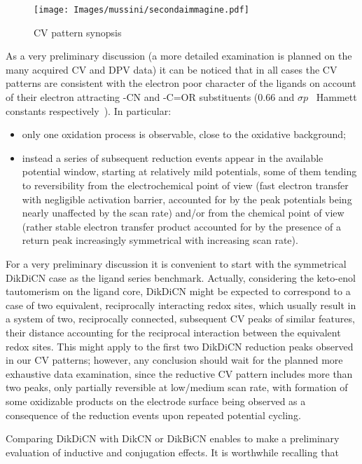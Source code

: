 \documentclass[../Master.tex]{subfiles}
\begin{document}
\begin{figure}[h!]
	\centering
	\texttt{[image: Images/mussini/secondaimmagine.pdf]}
	\caption{CV pattern synopsis}
	\label{fig:synops}

\end{figure}
\newpage

As a very preliminary discussion (a more detailed examination is planned on the
many acquired CV and DPV data) it can be noticed that in all cases the CV
patterns are consistent with the electron poor character of the ligands on
account of their electron attracting -CN and -C=OR substituents (0.66 and 
\(\sigma p\) \ Hammett constants respectively\ \cite{hansch_survey_1991}). In particular:
\begin{itemize}
	\item only one oxidation process is observable, close to the oxidative background;
	\item instead a series of subsequent reduction events appear in the available potential window, starting at relatively mild potentials, some of them tending to reversibility from the electrochemical point of view (fast electron transfer with negligible activation barrier, accounted for by the peak potentials being nearly unaffected by the scan rate) and/or from the chemical point of view (rather stable electron transfer product accounted for by the presence of a return peak increasingly symmetrical with increasing scan rate).
\end{itemize}

For a very preliminary discussion it is convenient to start with the symmetrical DikDiCN case as the ligand series benchmark. Actually, considering the keto-enol tautomerism on the ligand core, DikDiCN might be expected to correspond to a case of two equivalent, reciprocally interacting redox sites, which usually result in a system of two, reciprocally connected, subsequent CV peaks of similar features, their distance accounting for the reciprocal interaction between the equivalent redox sites. This might apply to the first two DikDiCN reduction peaks observed in our CV patterns; however, any conclusion should wait for the planned more exhaustive data examination, since the reductive CV pattern includes more than two peaks, only partially reversible at low/medium scan rate, with formation of some oxidizable products on the electrode surface being observed as a consequence of the reduction events upon repeated potential cycling.

Comparing DikDiCN with DikCN or DikBiCN enables to make a preliminary evaluation of inductive and conjugation effects. It is worthwhile recalling that
\end{document}
